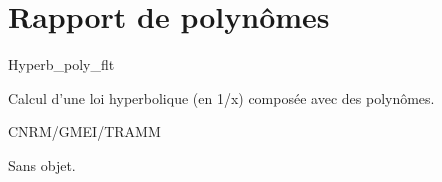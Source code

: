 %
\section{Rapport de polyn\^omes}

 \textsf{Hyperb\_poly\_flt}

Calcul d'une loi hyperbolique (en 1/x) 
compos\'ee avec des polyn\^omes.

\bigskip





CNRM/GMEI/TRAMM

Sans objet.

